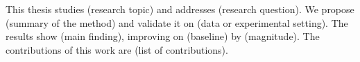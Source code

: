 
This thesis studies (research topic) and addresses (research question).
We propose (summary of the method) and validate it on (data or experimental
setting). The results show (main finding), improving on (baseline) by
(magnitude). The contributions of this work are (list of contributions).
